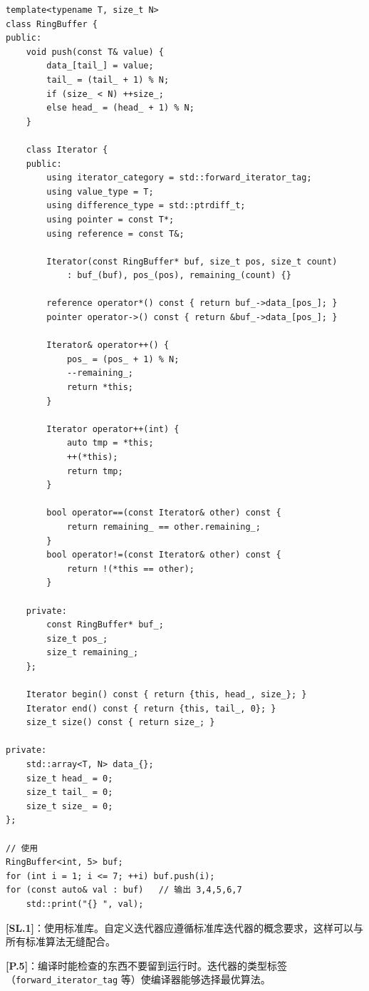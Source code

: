 \documentclass[12pt,a4paper,fontset=fandol]{ctexbook}
\newcommand{\guideref}[1]{\textbf{\textcolor{blue!70!black}{[#1]}}}
\begin{document}
\begin{lstlisting}[style=cppstyle, caption={自定义迭代器 --- 环形缓冲区}]
template<typename T, size_t N>
class RingBuffer {
public:
    void push(const T& value) {
        data_[tail_] = value;
        tail_ = (tail_ + 1) % N;
        if (size_ < N) ++size_;
        else head_ = (head_ + 1) % N;
    }

    class Iterator {
    public:
        using iterator_category = std::forward_iterator_tag;
        using value_type = T;
        using difference_type = std::ptrdiff_t;
        using pointer = const T*;
        using reference = const T&;

        Iterator(const RingBuffer* buf, size_t pos, size_t count)
            : buf_(buf), pos_(pos), remaining_(count) {}

        reference operator*() const { return buf_->data_[pos_]; }
        pointer operator->() const { return &buf_->data_[pos_]; }

        Iterator& operator++() {
            pos_ = (pos_ + 1) % N;
            --remaining_;
            return *this;
        }

        Iterator operator++(int) {
            auto tmp = *this;
            ++(*this);
            return tmp;
        }

        bool operator==(const Iterator& other) const {
            return remaining_ == other.remaining_;
        }
        bool operator!=(const Iterator& other) const {
            return !(*this == other);
        }

    private:
        const RingBuffer* buf_;
        size_t pos_;
        size_t remaining_;
    };

    Iterator begin() const { return {this, head_, size_}; }
    Iterator end() const { return {this, tail_, 0}; }
    size_t size() const { return size_; }

private:
    std::array<T, N> data_{};
    size_t head_ = 0;
    size_t tail_ = 0;
    size_t size_ = 0;
};

// 使用
RingBuffer<int, 5> buf;
for (int i = 1; i <= 7; ++i) buf.push(i);
for (const auto& val : buf)   // 输出 3,4,5,6,7
    std::print("{} ", val);
\end{lstlisting}

\begin{guideline}
\guideref{SL.1}：使用标准库。自定义迭代器应遵循标准库迭代器的概念要求，这样可以与所有标准算法无缝配合。

\guideref{P.5}：编译时能检查的东西不要留到运行时。迭代器的类型标签（\texttt{forward\_\allowbreak{}iterator\_\allowbreak{}tag} 等）使编译器能够选择最优算法。
\end{guideline}
\end{document}
